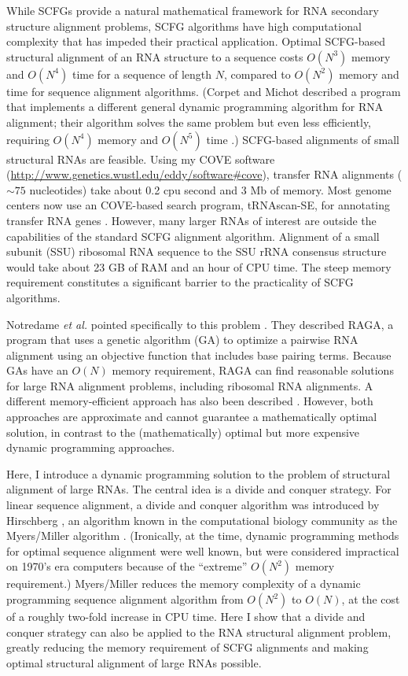 \documentclass[11pt]{article}
\begin{document}
While SCFGs provide a natural mathematical framework for RNA secondary
structure alignment problems, SCFG algorithms have high computational
complexity that has impeded their practical application. Optimal
SCFG-based structural alignment of an RNA structure to a sequence
costs $O(N^3)$ memory and $O(N^4)$ time for a sequence of length $N$,
compared to $O(N^2)$ memory and time for sequence alignment
algorithms. (Corpet and Michot described a program that implements a
different general dynamic programming algorithm for RNA alignment;
their algorithm solves the same problem but even less efficiently,
requiring $O(N^4)$ memory and $O(N^5)$ time \cite{Corpet94}.)
SCFG-based alignments of small structural RNAs are feasible. Using my
COVE software
(\url{http://www.genetics.wustl.edu/eddy/software#cove}), transfer RNA
alignments ($\sim 75$ nucleotides) take about 0.2 cpu second and 3 Mb
of memory. Most genome centers now use an COVE-based search program,
tRNAscan-SE, for annotating transfer RNA genes
\cite{LoweEddy97}. However, many larger RNAs of interest are outside
the capabilities of the standard SCFG alignment algorithm. Alignment
of a small subunit (SSU) ribosomal RNA sequence to the SSU rRNA
consensus structure would take about 23 GB of RAM and an hour of CPU
time. The steep memory requirement constitutes a significant barrier
to the practicality of SCFG algorithms.

Notredame \emph{et al.} pointed specifically to this problem
\cite{Notredame97}.  They described RAGA, a program that uses a
genetic algorithm (GA) to optimize a pairwise RNA alignment using an
objective function that includes base pairing terms. Because GAs have
an $O(N)$ memory requirement, RAGA can find reasonable solutions for
large RNA alignment problems, including ribosomal RNA alignments. A
different memory-efficient approach has also been described
\cite{Lenhof98,LenhofVingron98}. However, both approaches are
approximate and cannot guarantee a mathematically optimal solution, in
contrast to the (mathematically) optimal but more expensive dynamic
programming approaches.

Here, I introduce a dynamic programming solution to the problem of
structural alignment of large RNAs. The central idea is a divide and
conquer strategy. For linear sequence alignment, a divide and conquer
algorithm was introduced by Hirschberg \cite{Hirschberg75}, an
algorithm known in the computational biology community as the
Myers/Miller algorithm \cite{MyM-88a}. (Ironically, at the time,
dynamic programming methods for optimal sequence alignment were well
known, but were considered impractical on 1970's era computers because
of the ``extreme'' $O(N^2)$ memory requirement.) Myers/Miller reduces
the memory complexity of a dynamic programming sequence alignment
algorithm from $O(N^2)$ to $O(N)$, at the cost of a roughly two-fold
increase in CPU time. Here I show that a divide and conquer strategy
can also be applied to the RNA structural alignment problem, greatly
reducing the memory requirement of SCFG alignments and making optimal
structural alignment of large RNAs possible.
\end{document}
